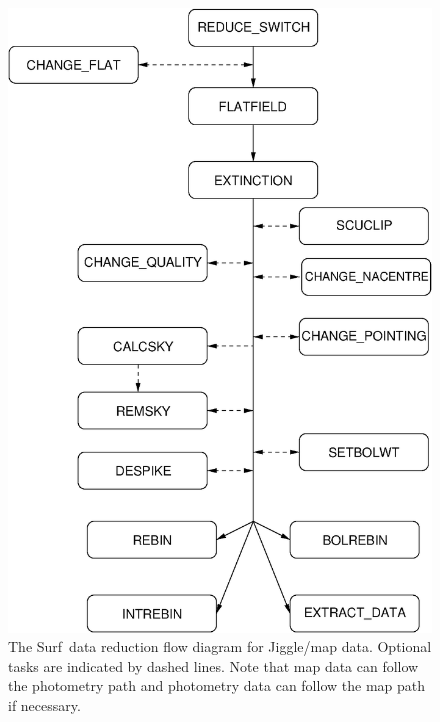 \documentclass[twoside,11pt]{article}
\newcommand{\scusoft}          {{\sc Surf}}
\newcommand{\htmlimage}[1]{}
\renewcommand{\_}{\texttt{\symbol{95}}}
\begin{document}
\begin{figure}
\begin{center}
\includegraphics[width=5in]{sun216_flow_jig.eps}
\end{center}
\caption{The \scusoft\ data reduction flow diagram for Jiggle/map
data. Optional tasks are
indicated by dashed lines. Note that map data can follow the photometry
path and photometry data can follow the map path if necessary.
}
\label{flowpath_jig}
\end{figure}
\end{document}
